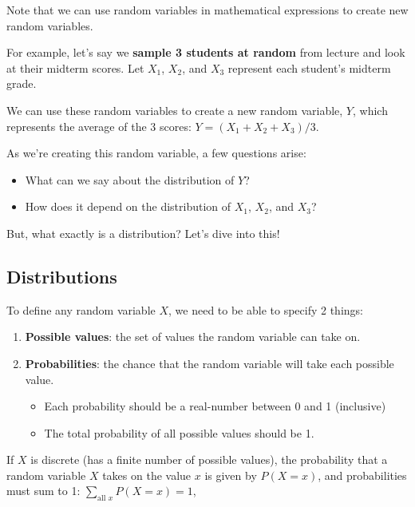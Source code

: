 \documentclass[
  letterpaper,
  DIV=11,
  numbers=noendperiod]{scrreprt}
\providecommand{\tightlist}{%
  \setlength{\itemsep}{0pt}\setlength{\parskip}{0pt}}\usepackage{longtable,booktabs,array}
\begin{document}
Note that we can use random variables in mathematical expressions to
create new random variables.

For example, let's say we \textbf{sample 3 students at random} from
lecture and look at their midterm scores. Let \(X_1\), \(X_2\), and
\(X_3\) represent each student's midterm grade.

We can use these random variables to create a new random variable,
\(Y\), which represents the average of the 3 scores:
\(Y = (X_1 + X_2 + X_3)/3\).

As we're creating this random variable, a few questions arise:

\begin{itemize}
\tightlist
\item
  What can we say about the distribution of \(Y\)?
\item
  How does it depend on the distribution of \(X_1\), \(X_2\), and
  \(X_3\)?
\end{itemize}

But, what exactly is a distribution? Let's dive into this!

\subsection{Distributions}\label{distributions}

To define any random variable \(X\), we need to be able to specify 2
things:

\begin{enumerate}
\def\labelenumi{\arabic{enumi}.}
\tightlist
\item
  \textbf{Possible values}: the set of values the random variable can
  take on.
\item
  \textbf{Probabilities}: the chance that the random variable will take
  each possible value.

  \begin{itemize}
  \tightlist
  \item
    Each probability should be a real-number between 0 and 1 (inclusive)
  \item
    The total probability of all possible values should be 1.
  \end{itemize}
\end{enumerate}

If \(X\) is discrete (has a finite number of possible values), the
probability that a random variable \(X\) takes on the value \(x\) is
given by \(P(X=x)\), and probabilities must sum to 1:
\(\underset{\text{all } x}{\sum} P(X=x) = 1\),
\end{document}
